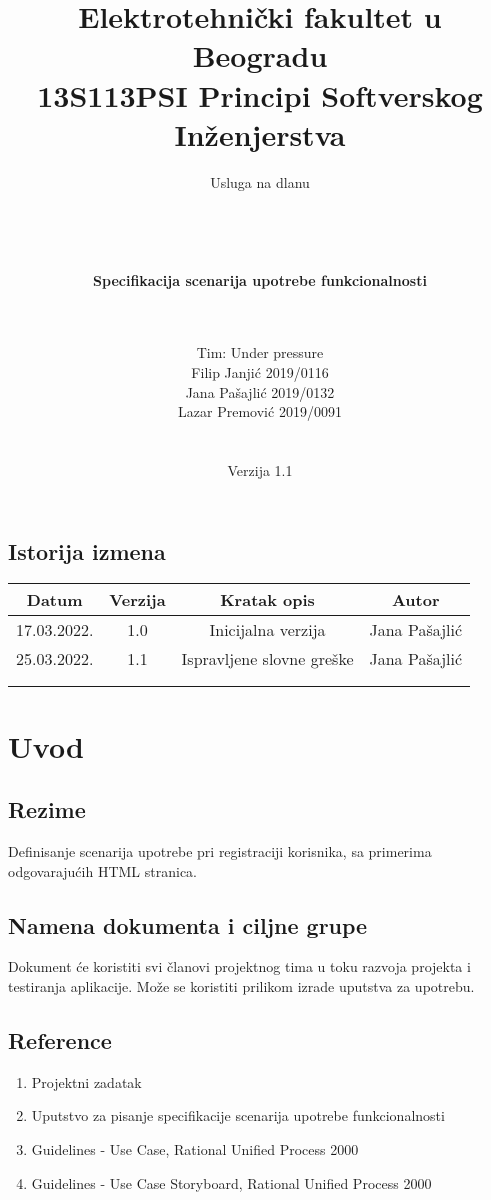 \documentclass[a4paper,12pt]{report}
\title{\Large Elektrotehnički fakultet u Beogradu \\ 13S113PSI Principi Softverskog Inženjerstva}
\author{\Huge Usluga na dlanu\\ \ \\ \ \\ \ \\ \ \\
	\Large \textbf{Specifikacija scenarija upotrebe funkcionalnosti}\\\Large \textbf{\genitivfunkcionalnosti} \\ \ \\}
\date{\Large   Tim: Under pressure \\ Filip Janjić 2019/0116 \\ Jana Pašajlić 2019/0132 \\ Lazar Premović 2019/0091  \\ \  \\ \  \\\large Verzija 1.1}
\newcommand{\dativfunkcionalnosti }{registraciji korisnika}
\newcommand{\inicijalniautor}{Jana Pašajlić}
\newcommand{\inicijalnidatum}{17.03.2022.}
\begin{document}
\maketitle

\begin{center}
\section*{Istorija izmena}
\begin{tabular}{ |c|c|c|c| }
\hline
\textbf{Datum} & \textbf{Verzija} & \textbf{Kratak opis} & \textbf{Autor} \\ 
\hline
 \inicijalnidatum & 1.0  & Inicijalna verzija & \inicijalniautor \\
 \hline
 25.03.2022. & 1.1  & Ispravljene slovne greške & \inicijalniautor \\
 \hline
 &  &  &  \\
 \hline
 &  &  &  \\
 \hline
\end{tabular}
\end{center}
\newpage

\tableofcontents

\newpage
\section{Uvod}
\subsection{Rezime}
Definisanje scenarija upotrebe pri \dativfunkcionalnosti, sa primerima odgovarajućih HTML stranica.
\subsection{Namena dokumenta i ciljne grupe}
Dokument će koristiti svi članovi projektnog tima u toku razvoja projekta i testiranja aplikacije. Može se koristiti prilikom izrade uputstva za upotrebu.
\subsection{Reference}
    \begin{enumerate}
        \item Projektni zadatak
        \item Uputstvo za pisanje specifikacije scenarija upotrebe funkcionalnosti 
        \item Guidelines - Use Case, Rational Unified Process 2000
        \item Guidelines - Use Case Storyboard, Rational Unified Process 2000
    \end{enumerate}
\end{document}
